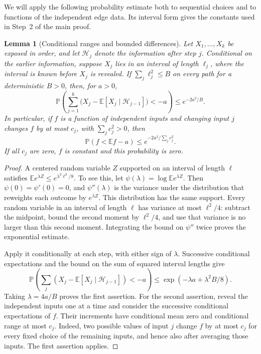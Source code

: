 \documentclass[11pt,a4paper]{article}
\newtheorem{lemma}[theorem]{Lemma}
\theoremstyle{definition}
\theoremstyle{remark}
\newcommand{\E}{\mathbb E}
\newcommand{\Prb}{\mathbb P}
\begin{document}
\begin{samepage}
We will apply the following probability estimate both to sequential
choices and to functions of the independent edge data. Its interval
form gives the constants used in Step~2 of the main proof.

\begin{lemma}[Conditional ranges and bounded differences]\label{lem:random_ranges}
Let $X_1,\ldots,X_k$ be exposed in order, and let $\mathcal H_j$ denote
the information after step $j$. Conditional on the earlier information,
suppose $X_j$ lies in an interval of length $\ell_j$,
where the interval is known before $X_j$ is revealed. If
$\sum_j\ell_j^2\le B$ on every path for a deterministic $B>0$, then,
for $a>0$,
\[
 \Prb\left(\sum_{j=1}^k
       \bigl(X_j-\E[X_j\mid\mathcal H_{j-1}]\bigr)<-a\right)
 \le e^{-2a^2/B}.
\]
In particular, if $f$ is a function of independent inputs and changing
input $j$ changes $f$ by at most $c_j$, with $\sum_jc_j^2>0$, then
\[
\Prb(f<\E f-a)\le e^{-2a^2/\sum_jc_j^2}.
\]
If all $c_j$ are zero, $f$ is constant and this probability is zero.
\end{lemma}
\end{samepage}
\begin{proof}
A centered random variable $Z$ supported on an interval of length $\ell$
satisfies
$\E e^{\lambda Z}\le e^{\lambda^2\ell^2/8}$.
To see this, let $\psi(\lambda)=\log\E e^{\lambda Z}$.
Then $\psi(0)=\psi'(0)=0$, and $\psi''(\lambda)$ is the variance under
the distribution that reweights each outcome by $e^{\lambda Z}$.
This distribution has the same support. Every random variable in an
interval of length $\ell$ has variance at most $\ell^2/4$: subtract the
midpoint, bound the second moment by $\ell^2/4$, and use that variance
is no larger than this second moment. Integrating the bound on
$\psi''$ twice proves the exponential estimate.

Apply it conditionally at each step, with either sign of $\lambda$.
Successive conditional expectations and the bound on the sum of squared
interval lengths give
\[
 \Prb\left(\sum_j
       (X_j-\E[X_j\mid\mathcal H_{j-1}])<-a\right)
 \le \exp(-\lambda a+\lambda^2B/8).
\]
Taking $\lambda=4a/B$ proves the first assertion.
For the second assertion, reveal the independent
inputs one at a time and consider the successive conditional expectations
of $f$. Their increments have conditional mean zero and conditional
range at most $c_j$. Indeed, two possible values of input $j$ change
$f$ by at most $c_j$ for every fixed choice of the remaining inputs,
and hence also after averaging those inputs. The first assertion applies.
\end{proof}
\end{document}
